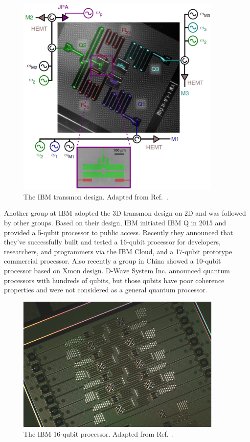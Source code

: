 \documentclass[%
groupedaddress,
showpacs,
 amsmath,amssymb,
 aps,
prb,
]{revtex4-1}
\begin{document}
            \begin{figure}[h]
                \centering
                \includegraphics[width=4in]{review/IBMTransmon2014.png}
                \caption{The IBM transmon design. Adapted from Ref.~.}
                \label{fig:IBMTransmon2014}
            \end{figure}


Another group at IBM adopted the 3D transmon design on 2D\cite{Chow2014,Takita2017} and was followed by other groups\cite{Mlynek2014,Pechal2016,Walter2017}. Based on their design, IBM initiated IBM Q in 2015 and provided a 5-qubit processor to public access\cite{IBMQ}. Recently they announced that they've successfully built and tested a 16-qubit processor for developers, researchers, and programmers via the IBM Cloud, and a 17-qubit prototype commercial processor\cite{IBM16QubitsOriginal}. Also recently a group in China showed a 10-qubit processor based on Xmon design\cite{Song2017}. D-Wave System Inc. announced quantum processors with hundreds of qubits\cite{Shin2014}, but those qubits have poor coherence properties and were not considered as a general quantum processor\cite{devoret2013superconducting}.



            \begin{figure}[h]
                \centering
                \includegraphics[width=4in]{review/ibmbuildsits.jpg}
                \caption{The IBM 16-qubit processor. Adapted from Ref.~.}
                \label{fig:ibmbuildsits}
            \end{figure}
\end{document}
